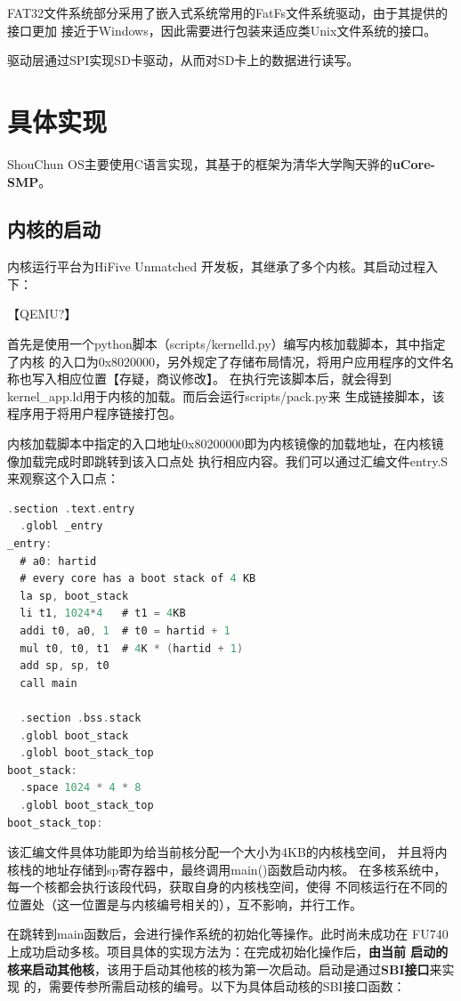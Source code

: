 \documentclass[UTF8,a4paper,10pt]{ctexart}
\begin{document}
FAT32文件系统部分采用了嵌入式系统常用的FatFs文件系统驱动，由于其提供的接口更加
接近于Windows，因此需要进行包装来适应类Unix文件系统的接口。

驱动层通过SPI实现SD卡驱动，从而对SD卡上的数据进行读写。

\section{具体实现}

ShouChun OS主要使用C语言实现，其基于的框架为清华大学陶天骅的\textbf{uCore-SMP}。

\subsection{内核的启动}

内核运行平台为HiFive Unmatched 开发板，其继承了多个内核。其启动过程入下：

【QEMU?】

首先是使用一个python脚本（scripts/kernelld.py）编写内核加载脚本，其中指定了内核
的入口为0x8020000，另外规定了存储布局情况，将用户应用程序的文件名称也写入相应位置【存疑，商议修改】。
在执行完该脚本后，就会得到kernel\_app.ld用于内核的加载。而后会运行scripts/pack.py来
生成链接脚本，该程序用于将用户程序链接打包。

内核加载脚本中指定的入口地址0x80200000即为内核镜像的加载地址，在内核镜像加载完成时即跳转到该入口点处
执行相应内容。我们可以通过汇编文件entry.S来观察这个入口点：

\begin{lstlisting}[title=内核镜像入口,frame=trbl,language={C}]
  .section .text.entry
  .globl _entry
_entry:
  # a0: hartid
  # every core has a boot stack of 4 KB
  la sp, boot_stack
  li t1, 1024*4   # t1 = 4KB
  addi t0, a0, 1  # t0 = hartid + 1
  mul t0, t0, t1  # 4K * (hartid + 1)
  add sp, sp, t0  
  call main

  .section .bss.stack
  .globl boot_stack
  .globl boot_stack_top
boot_stack:
  .space 1024 * 4 * 8
  .globl boot_stack_top
boot_stack_top:
\end{lstlisting}

该汇编文件具体功能即为给当前核分配一个大小为4KB的内核栈空间，
并且将内核栈的地址存储到sp寄存器中，最终调用main()函数启动内核。
在多核系统中，每一个核都会执行该段代码，获取自身的内核栈空间，使得
不同核运行在不同的位置处（这一位置是与内核编号相关的），互不影响，并行工作。

在跳转到main函数后，会进行操作系统的初始化等操作。此时尚未成功在
FU740上成功启动多核。项目具体的实现方法为：在完成初始化操作后，\textbf{由当前
启动的核来启动其他核}，该用于启动其他核的核为第一次启动。启动是通过\textbf{SBI接口}来实现
的，需要传参所需启动核的编号。以下为具体启动核的SBI接口函数：
\end{document}
